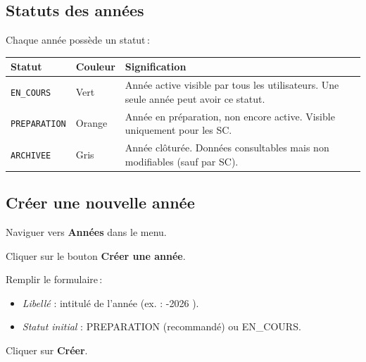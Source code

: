 \subsection{Statuts des ann\'ees}

Chaque ann\'ee poss\`ede un statut\,:

\medskip
\begin{tabularx}{\textwidth}{L{3cm}C{2.5cm}X}
  \toprule
  \textbf{Statut} & \textbf{Couleur} & \textbf{Signification} \\
  \midrule
  \texttt{EN\_COURS}   & Vert  & Ann\'ee active visible par tous les utilisateurs. Une seule ann\'ee peut avoir ce statut. \\
  \texttt{PREPARATION} & Orange & Ann\'ee en pr\'eparation, non encore active. Visible uniquement pour les SC. \\
  \texttt{ARCHIVEE}    & Gris  & Ann\'ee cl\^otur\'ee. Donn\'ees consultables mais non modifiables (sauf par SC). \\
  \bottomrule
\end{tabularx}

\subsection{Cr\'eer une nouvelle ann\'ee}

\begin{steps}
  \item Naviguer vers \textbf{Ann\'ees} dans le menu.
  \item Cliquer sur le bouton \textbf{Cr\'eer une ann\'ee}.
  \item Remplir le formulaire\,:
    \begin{itemize}
      \item \textit{Libell\'e} : intitul\'e de l'ann\'ee (ex. : -2026 \fg).
      \item \textit{Statut initial} : PREPARATION (recommand\'e) ou EN\_COURS.
    \end{itemize}
  \item Cliquer sur \textbf{Cr\'eer}.
\end{steps}



